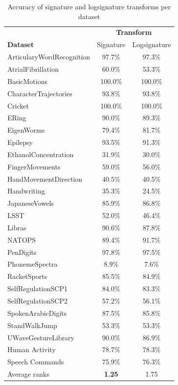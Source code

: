 \documentclass{article}
\theoremstyle{definition}
\theoremstyle{remark}
\begin{document}
	\begin{table}[]
	\small
	\centering
	\caption{Accuracy of signature and logsignature transforms per dataset}
	\label{tab:complete_results_sig_logsig}
	\begin{tabular}{lcc}
	\toprule
	& \multicolumn{2}{c}{\textbf{Transform}}\\
	 \cmidrule{2-3}
	\textbf{Dataset}& Signature & Logsignature  \\
	\midrule
	ArticularyWordRecognition & 97.7\% & 97.3\% \\
	AtrialFibrillation & 60.0\% & 53.3\% \\
	BasicMotions & 100.0\% & 100.0\% \\
	CharacterTrajectories & 93.8\% & 93.8\% \\
	Cricket & 100.0\% & 100.0\% \\
	ERing & 90.0\% & 89.3\% \\
	EigenWorms & 79.4\% & 81.7\% \\
	Epilepsy & 93.5\% & 91.3\% \\
	EthanolConcentration & 31.9\% & 30.0\% \\
	FingerMovements & 59.0\% & 56.0\% \\
	HandMovementDirection & 40.5\% & 40.5\% \\
	Handwriting & 35.3\% & 24.5\% \\
	JapaneseVowels & 85.9\% & 86.8\% \\
	LSST & 52.0\% & 46.4\% \\
	Libras & 90.6\% & 87.8\% \\
	NATOPS & 89.4\% & 91.7\% \\
	PenDigits & 97.8\% & 97.5\% \\
	PhonemeSpectra & 8.9\% & 7.6\% \\
	RacketSports & 85.5\% & 84.9\% \\
	SelfRegulationSCP1 & 84.0\% & 83.3\% \\
	SelfRegulationSCP2 & 57.2\% & 56.1\% \\
	SpokenArabicDigits & 87.5\% & 85.8\% \\
	StandWalkJump & 53.3\% & 53.3\% \\
	UWaveGestureLibrary & 90.0\% & 86.9\% \\
	Human Activity & 78.7\% & 78.3\% \\
	Speech Commands & 75.9\% & 76.3\% \\
	\midrule
	Average ranks & \textbf{1.25} & 1.75 \\
	\bottomrule
	\end{tabular}
	\end{table}
\end{document}
